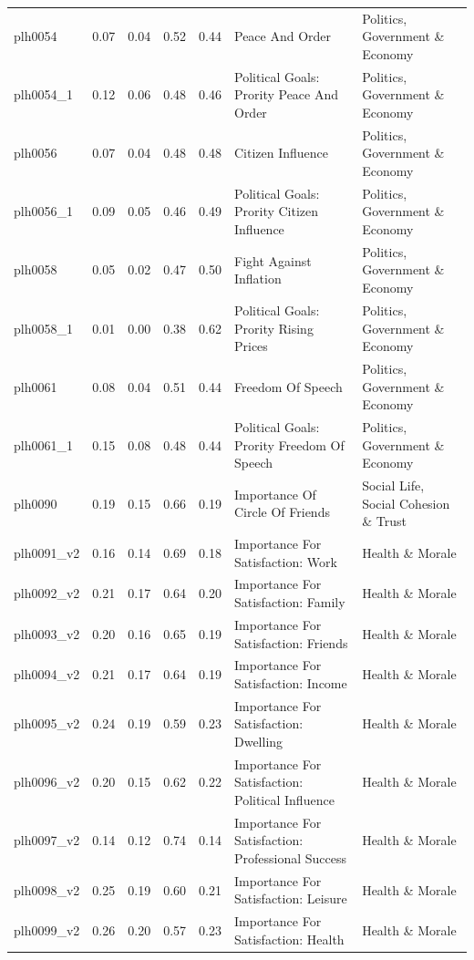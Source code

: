 \documentclass[
  12pt,
]{article}
\begin{document}
\begin{landscape}
\begin{scriptsize}
\begin{longtable}{|p{1.75in}|p{0.3in}|p{0.3in}|p{0.3in}|p{0.3in}|p{2.5in}|p{2.5in}}
plh0054 & 0.07 & 0.04 & 0.52 & 0.44 & Peace And Order & Politics, Government \& Economy \\ 
plh0054\_1 & 0.12 & 0.06 & 0.48 & 0.46 & Political Goals: Prority Peace And Order & Politics, Government \& Economy \\ 
plh0056 & 0.07 & 0.04 & 0.48 & 0.48 & Citizen Influence & Politics, Government \& Economy \\ 
plh0056\_1 & 0.09 & 0.05 & 0.46 & 0.49 & Political Goals: Prority Citizen Influence & Politics, Government \& Economy \\ 
plh0058 & 0.05 & 0.02 & 0.47 & 0.50 & Fight Against Inflation & Politics, Government \& Economy \\ 
plh0058\_1 & 0.01 & 0.00 & 0.38 & 0.62 & Political Goals: Prority Rising Prices & Politics, Government \& Economy \\ 
plh0061 & 0.08 & 0.04 & 0.51 & 0.44 & Freedom Of Speech & Politics, Government \& Economy \\ 
plh0061\_1 & 0.15 & 0.08 & 0.48 & 0.44 & Political Goals: Prority Freedom Of Speech & Politics, Government \& Economy \\ 
plh0090 & 0.19 & 0.15 & 0.66 & 0.19 & Importance Of Circle Of Friends & Social Life, Social Cohesion \& Trust \\ 
plh0091\_v2 & 0.16 & 0.14 & 0.69 & 0.18 & Importance For Satisfaction: Work & Health \& Morale \\ 
plh0092\_v2 & 0.21 & 0.17 & 0.64 & 0.20 & Importance For Satisfaction: Family & Health \& Morale \\ 
plh0093\_v2 & 0.20 & 0.16 & 0.65 & 0.19 & Importance For Satisfaction: Friends & Health \& Morale \\ 
plh0094\_v2 & 0.21 & 0.17 & 0.64 & 0.19 & Importance For Satisfaction: Income & Health \& Morale \\ 
plh0095\_v2 & 0.24 & 0.19 & 0.59 & 0.23 & Importance For Satisfaction: Dwelling & Health \& Morale \\ 
plh0096\_v2 & 0.20 & 0.15 & 0.62 & 0.22 & Importance For Satisfaction: Political Influence & Health \& Morale \\ 
plh0097\_v2 & 0.14 & 0.12 & 0.74 & 0.14 & Importance For Satisfaction: Professional Success & Health \& Morale \\ 
plh0098\_v2 & 0.25 & 0.19 & 0.60 & 0.21 & Importance For Satisfaction: Leisure & Health \& Morale \\ 
plh0099\_v2 & 0.26 & 0.20 & 0.57 & 0.23 & Importance For Satisfaction: Health & Health \& Morale \\ 

\end{longtable}
\end{scriptsize}
\end{landscape}
\end{document}
